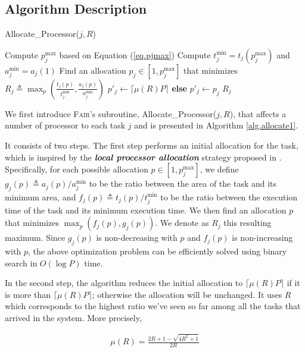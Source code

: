\documentclass{article}
\newcommand\fair{\textsc{Fair}\xspace}
\newcommand\ratio{R\xspace}
\begin{document}
\subsection{Algorithm Description}

{
\begin{algorithm}[t]
    \footnotesize
    \caption{Allocate\_Processor($j,\ratio$)}\label{alg.allocate1}
    \KwIn{Task $j$ and Ratio $\ratio$ }
    Compute $p_j^{\max}$ based on Equation (\ref{eq.pjmax})\;
    Compute $t_j^{\min} = t_j(p_j^{\max})$ and $a_j^{\min} = a_j(1)$\;
    Find an allocation $p_j \in [1, p_j^{\max}]$ that minimizes $\ratio_j \triangleq \max_p\left(\frac{t_j(p)}{t_j^{\min}}, \frac{a_j(p)}{a_j^{\min}}\right)$\;
    {
        $p'_j \leftarrow \lceil \mu(R) P \rceil$ \textbf{else} $p'_j \leftarrow p_j$
    }
   \Return $\ratio_j$\;
\end{algorithm}
}

We first introduce \fair's subroutine, Allocate\_Processor($j,\ratio$), that affects a number of processor to each task $j$ and is presented in Algorithm \ref{alg.allocate1}.

It consists of two steps. The first step performs an initial allocation for the task, which is inspired by the \textbf{\emph{local processor allocation}} strategy proposed in \cite{Benoit20_cluster, Benoit21_ieeetc}. Specifically, for each possible allocation $p\in [1, p_j^{\max}]$, we define $g_j(p) \triangleq a_j(p)/a_j^{\min}$ to be the ratio between the area of the task and its minimum area, and $f_j(p) \triangleq t_j(p)/t_j^{\min}$ to be the ratio between the execution time of the task and its minimum execution time. We then find an allocation $p$ that minimizes $\max_p(f_j(p),g_j(p))$. We denote as $\ratio_j$ this resulting maximum. Since $g_j(p)$ is non-decreasing with $p$ and $f_j(p)$ is non-increasing with $p$, the above optimization problem can be efficiently solved using binary search in $O(\log P)$ time.

In the second step, the algorithm reduces the initial allocation to $\lceil \mu(\ratio) P \rceil$ if it is more than $\lceil \mu(\ratio) P \rceil$; otherwise the allocation will be unchanged. It uses $\ratio$ which corresponds to the highest ratio we've seen so far among all the tasks that arrived in the system. More precisely, 

\begin{align}\label{eq.muR}
\mu(\ratio)=\frac{2\ratio+1-\sqrt{4\ratio^2+1}}{2\ratio}
\end{align}  
\end{document}
